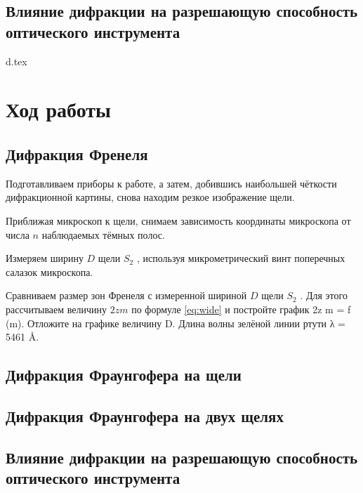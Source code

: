 \documentclass[a5paper,10pt, twoside]{article} %
\begin{document}
\subsection{Влияние дифракции на разрешающую способность оптического инструмента}
    {d.tex}

\section{Ход работы}

\subsection{Дифракция Френеля}

Подготавливаем приборы к работе, а затем, добившись наибольшей чёткости дифракционной картины, снова 
находим резкое изображение щели.

Приближая микроскоп к щели, снимаем зависимость координаты микроскопа от числа $n$ наблюдаемых тёмных 
полос.

Измеряем ширину $D$ щели $S_2$ , используя микрометрический винт поперечных салазок микроскопа.

Сравниваем размер зон Френеля с измеренной шириной $D$ щели $S_2$ . Для этого рассчитываем величину
$2 z m$ по формуле \eqref{eq:wide} 
и постройте график 2z m = f (m). Отложите на графике величину D.
Длина волны зелёной линии ртути λ = 5461 Å.

\subsection{Дифракция Фраунгофера на щели}
\subsection{Дифракция Фраунгофера на двух щелях}
\subsection{Влияние дифракции на разрешающую способность оптического инструмента}
\end{document}
